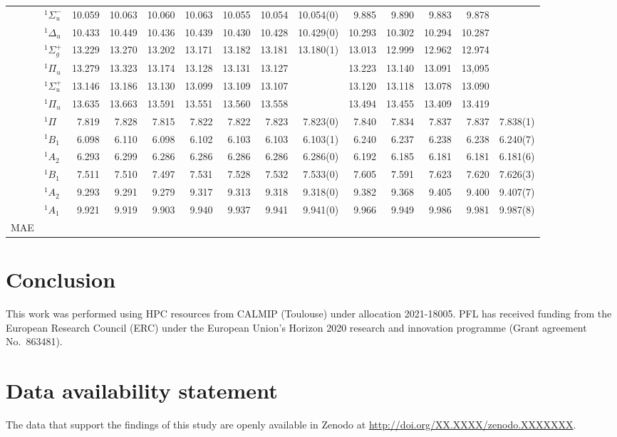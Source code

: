 \documentclass[aps,prb,reprint,noshowkeys,superscriptaddress]{revtex4-1}
\begin{document}
\begin{squeezetable}
\begin{table*}
\begin{ruledtabular}
\begin{tabular}{llrrrrrrrrrrrr}
				&	$^1\Sigma_u^-$	&10.059	&10.063	&10.060	&10.063	&10.055	&10.054	&10.054(0)	&9.885	&9.890	&9.883	&9.878	&	\\
				&	$^1\Delta_u$ 	&10.433	&10.449	&10.436	&10.439	&10.430	&10.428	&10.429(0)	&10.293	&10.302	&10.294	&10.287	&	\\
				&	$^1\Sigma_g^+$	&13.229	&13.270	&13.202	&13.171	&13.182	&13.181	&13.180(1)	&13.013	&12.999	&12.962	&12.974	&	\\
				&	$^1\Pi_u$  		&13.279	&13.323	&13.174	&13.128	&13.131	&13.127	&			&13.223	&13.140	&13.091	&13,095	&	\\
				&	$^1\Sigma_u^+$	&13.146	&13.186	&13.130	&13.099	&13.109	&13.107	&			&13.120	&13.118	&13.078	&13.090	&	\\
				&	$^1\Pi_u$ 		&13.635	&13.663	&13.591	&13.551	&13.560	&13.558	&			&13.494	&13.455	&13.409	&13.419\\
	\ce{HCl}	&	$^1\Pi$ 		&7.819	&7.828	&7.815	&7.822	&7.822	&7.823	&7.823(0)	&7.840	&7.834	&7.837	&7.837	&7.838(1)\\
	\ce{H2S}	&	$^1B_1$  		&6.098	&6.110	&6.098	&6.102	&6.103	&6.103	&6.103(1)	&6.240	&6.237	&6.238	&6.238	&6.240(7)\\
				&	$^1A_2$  		&6.293	&6.299	&6.286	&6.286	&6.286	&6.286	&6.286(0)	&6.192	&6.185	&6.181	&6.181	&6.181(6) \\
	\ce{H2O}	&	$^1B_1$  		&7.511	&7.510	&7.497	&7.531	&7.528	&7.532	&7.533(0)	&7.605	&7.591	&7.623	&7.620	&7.626(3)\\
				&	$^1A_2$  		&9.293	&9.291	&9.279	&9.317	&9.313	&9.318	&9.318(0)	&9.382	&9.368	&9.405	&9.400	&9.407(7)\\
				&	$^1A_1$  		&9.921	&9.919	&9.903	&9.940	&9.937	&9.941	&9.941(0)	&9.966	&9.949	&9.986	&9.981	&9.987(8)\\
	\hline
	MAE			&					&	\\
	\end{tabular}
	\end{ruledtabular}
\end{table*}
\end{squeezetable}

\section{Conclusion}

\begin{acknowledgements}
This work was performed using HPC resources from CALMIP (Toulouse) under allocation 2021-18005.
PFL has received funding from the European Research Council (ERC) under the European Union's Horizon 2020 research and innovation programme (Grant agreement No.~863481).
\end{acknowledgements}

\section*{Data availability statement}
The data that support the findings of this study are openly available in Zenodo at \href{http://doi.org/XX.XXXX/zenodo.XXXXXXX}{http://doi.org/XX.XXXX/zenodo.XXXXXXX}.

\end{document}
